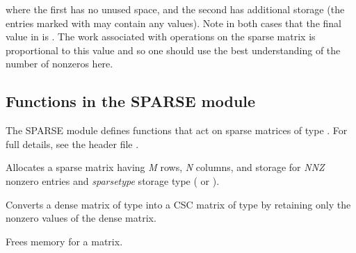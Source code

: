 \documentclass[letterpaper,10pt,english]{sphinxmanual}
\begin{document}
where the first has no unused space, and the second has additional
storage (the entries marked with \code{*} may contain any values).  Note
in both cases that the final value in  is .  The work
associated with operations on the sparse matrix is proportional to
this value and so one should use the best understanding of the number
of nonzeros here.


\subsection{Functions in the SPARSE module}
\label{linear_solvers/SLS:functions-in-the-sparse-module}
The SPARSE module defines functions that act on sparse matrices of
type {\hyperref[linear_solvers/SLS:c.SlsMat]{\emph{}}}.  For full details, see the header file
.

\begin{fulllineitems}
\label{linear_solvers/SLS:c.NewSparseMat}
Allocates a {\hyperref[linear_solvers/SLS:c.SlsMat]{\emph{}}} sparse matrix having \emph{M} rows, \emph{N}
columns, and storage for \emph{NNZ} nonzero entries and \emph{sparsetype}
storage type ( or ).

\end{fulllineitems}


\begin{fulllineitems}
\label{linear_solvers/SLS:c.SlsConvertDls}
Converts a dense matrix of type {\hyperref[linear_solvers/DLS:c.DlsMat]{\emph{}}} into a CSC
matrix of type {\hyperref[linear_solvers/SLS:c.SlsMat]{\emph{}}} by retaining only the nonzero
values of the dense matrix.

\end{fulllineitems}


\begin{fulllineitems}
\label{linear_solvers/SLS:c.DestroySparseMat}
Frees memory for a {\hyperref[linear_solvers/SLS:c.SlsMat]{\emph{}}} matrix.

\end{fulllineitems}
\end{document}

